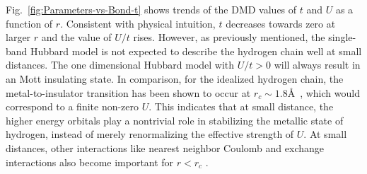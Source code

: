 Fig.~\ref{fig:Parameters-vs-Bond-t} shows trends of the DMD values of $t$ and $U$ as a function of $r$. 
Consistent with physical intuition, $t$ decreases towards zero at larger $r$
and the value of $U/t$ rises. However, as previously mentioned, the single-band 
Hubbard model is not expected to describe the hydrogen chain well at small distances. 
The one dimensional Hubbard model with $U/t>0$ will always result in 
an Mott insulating state. In comparison, for the idealized hydrogen chain, the 
metal-to-insulator transition has been shown to occur at $r_c \sim 1.8$\AA~\cite{Stella2011}, which would correspond 
to a finite non-zero $U$. This indicates that at small distance, the higher energy orbitals play a nontrivial 
role in stabilizing the metallic state of hydrogen, instead of merely renormalizing the effective strength of $U$. 
At small distances, other interactions like nearest neighbor Coulomb 
and exchange interactions also become important for $r<r_c$ \cite{ZhengThesis}. 
